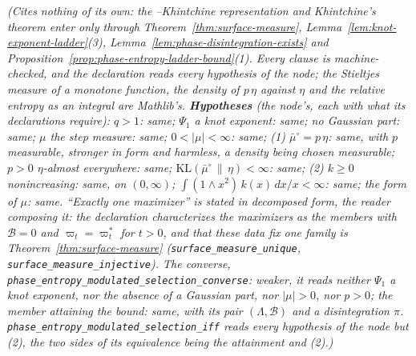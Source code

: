 \begin{theorem}[selection with a log-periodic factor]
\statusT\quad\emph{(Cites nothing of its own: the \Levy{}--Khintchine representation and
Khintchine's theorem enter only through Theorem~\ref{thm:surface-measure},
Lemma~\ref{lem:knot-exponent-ladder}(3), Lemma~\ref{lem:phase-disintegration-exists} and
Proposition~\ref{prop:phase-entropy-ladder-bound}(1). Every clause is machine-checked, and the
declaration reads every hypothesis of the node; the Stieltjes measure of a monotone function, the
density of $p\,\eta$ against $\eta$ and the relative entropy as an integral are Mathlib's.
\textbf{Hypotheses} (the node's, each with what its
declarations require): $q > 1$: same; $\Psi_1$ a knot exponent: same; no Gaussian part: same; $\mu$ the
step measure: same; $0 < |\mu| < \infty$: same; (1) $\bar\mu^\circ = p\,\eta$: same, with $p$
measurable, stronger in form and harmless, a density being chosen measurable; $p > 0$
$\eta$-almost everywhere: same; $\mathrm{KL}(\bar\mu^\circ \,\|\, \eta) < \infty$: same; (2) $k \ge 0$
nonincreasing: same, on $(0,\infty)$; $\int(1 \wedge x^2)\,k(x)\,dx/x < \infty$: same; the form of
$\mu$: same. ``Exactly one maximizer'' is stated in decomposed form, the reader composing it: the
declaration characterizes the maximizers as the members with $\mathcal{B} = 0$ and
$\varpi_t = \varpi^*_t$ for $t > 0$, and that these data fix one family is
Theorem~\ref{thm:surface-measure} (\texttt{surface\_measure\_unique},
\texttt{surface\_measure\_injective}). The converse,
\texttt{phase\_entropy\_modulated\_selection\_converse}: weaker, it reads neither $\Psi_1$ a knot
exponent, nor the absence of a Gaussian part, nor $|\mu| > 0$, nor $p > 0$; the member attaining
the bound: same, with its pair $(\Lambda, \mathcal{B})$ and a disintegration $\pi$.
\texttt{phase\_entropy\_modulated\_selection\_iff} reads every hypothesis of the node but (2), the
two sides of its equivalence being the attainment and (2).)}
\end{theorem}


